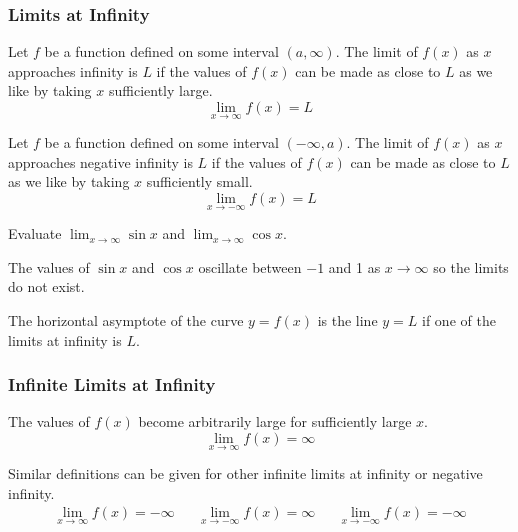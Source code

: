 \subsubsection*{Limits at Infinity}
\begin{definition}
    Let \(f\) be a function defined on some interval \((a,\infty)\).
    The limit of \(f(x)\) as \(x\) approaches infinity is \(L\) if the values
    of \(f(x)\) can be made as close to \(L\) as we like by taking \(x\)
    sufficiently large.
    \[\lim_{x\to\infty}f(x)=L\]
\end{definition}
\begin{definition}
    Let \(f\) be a function defined on some interval \((-\infty,a)\).
    The limit of \(f(x)\) as \(x\) approaches negative infinity is \(L\) if
    the values of \(f(x)\) can be made as close to \(L\) as we like by taking
    \(x\) sufficiently small.
    \[\lim_{x\to -\infty}f(x)=L\]
\end{definition}
\begin{problem}
    Evaluate \(\lim_{x\to\infty}\sin x\) and \(\lim_{x\to\infty}\cos x\).
\end{problem}
\begin{solution}
    The values of \(\sin x\) and \(\cos x\) oscillate between \(-1\) and 1 as
    \(x\to\infty\) so the limits do not exist.
\end{solution}
\begin{definition}
    The horizontal asymptote of the curve \(y=f(x)\) is the line \(y=L\) if
    one of the limits at infinity is \(L\).
\end{definition}

\subsubsection*{Infinite Limits at Infinity}
\begin{definition}
    The values of \(f(x)\) become arbitrarily large for sufficiently large
    \(x\).
    \[\lim_{x\to\infty}f(x)=\infty\]
\end{definition}
Similar definitions can be given for other infinite limits at infinity or
negative infinity.
\begin{align*}
    &\lim_{x\to\infty}f(x)=-\infty && \lim_{x\to -\infty}f(x)=\infty &
    & \lim_{x\to -\infty}f(x)=-\infty&
\end{align*}

